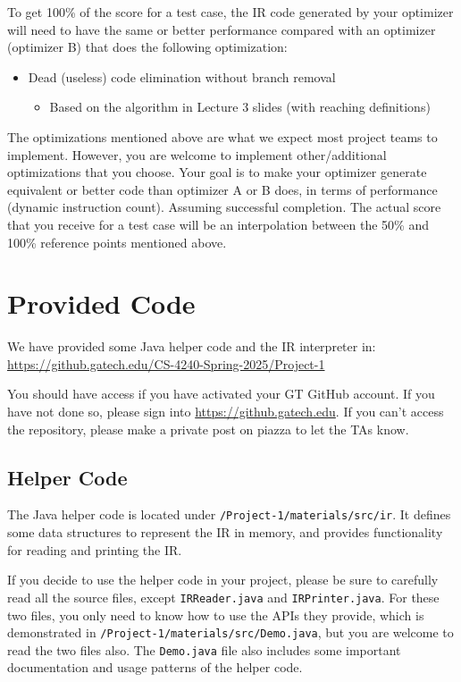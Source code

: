 \documentclass[12pt]{article}
\begin{document}
To get 100\% of the score for a test case, the IR code generated by
your optimizer will need to have the same or better performance
compared with an optimizer (optimizer B) that does the following
optimization:
\begin{itemize}
\item Dead (useless) code elimination without branch removal
\begin{itemize}
\item Based on the algorithm in  Lecture 3 slides (with reaching definitions)
\end{itemize}
\end{itemize}


The optimizations mentioned above are what we expect most project
teams to implement.  However, you are welcome to implement other/additional
optimizations that you choose.  
Your goal is to make your optimizer generate equivalent or better code than
optimizer A or B does,
in terms of performance (dynamic instruction count).  Assuming
successful completion.  The actual score
that you receive for a test case will be an interpolation between the
50\% and 100\% reference points mentioned above.

\section{Provided Code}\label{sec:code}

We have provided some Java helper code and the IR interpreter in:\\
\url{https://github.gatech.edu/CS-4240-Spring-2025/Project-1}

You should have access if you have activated your GT GitHub account.
If you have not done so, please sign into \url{https://github.gatech.edu}. 
If you can't access the repository, please make a private post on piazza to let the TAs know.

\subsection{Helper Code}

The Java helper code is located under \texttt{/Project-1/materials/src/ir}.
It defines some data structures to represent the IR in memory,
and provides functionality for reading and printing the IR.

If you decide to use the helper code in your project, please be sure
to carefully read all the source files, except \texttt{IRReader.java} and \texttt{IRPrinter.java}.
For these two files, you only need to know how to use the APIs they provide,
which is demonstrated in \texttt{/Project-1/materials/src/Demo.java}, but you are
welcome to read the two files also.
The \texttt{Demo.java} file also includes some important documentation and usage patterns of the helper code.
\end{document}
